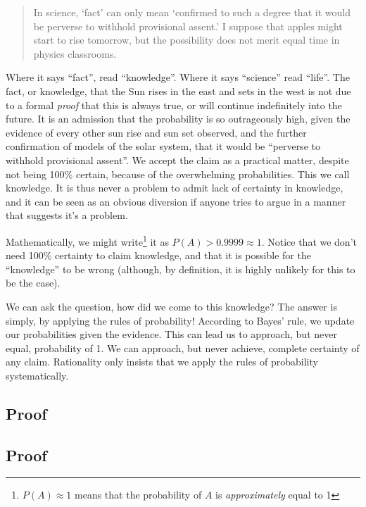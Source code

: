 \documentclass{tufte-book}
\begin{document}
\begin{quote}
In science, `fact' can only mean `confirmed to such a degree that it
would be perverse to withhold provisional assent.' I suppose that apples
might start to rise tomorrow, but the possibility does not merit equal
time in physics classrooms.\citep{gould1981evolution}
\end{quote}

Where it says ``fact'', read ``knowledge''. Where it says ``science''
read ``life''. The fact, or knowledge, that the Sun rises in the east
and sets in the west is not due to a formal \emph{proof} that this is
always true, or will continue indefinitely into the future. It is an
admission that the probability is so outrageously high, given the
evidence of every other sun rise and sun set observed, and the further
confirmation of models of the solar system, that it would be ``perverse
to withhold provisional assent''. We accept the claim as a practical
matter, despite not being 100\% certain, because of the overwhelming
probabilities. This we call knowledge. It is thus never a problem to
admit lack of certainty in knowledge, and it can be seen as an obvious
diversion if anyone tries to argue in a manner that suggests it's a
problem.

Mathematically, we might write\footnote{\(P(A)\approx 1\) means that the
  probability of \(A\) is \emph{approximately} equal to 1} it as
\(P(A)>0.9999 \approx 1\). Notice that we don't need 100\% certainty to
claim knowledge, and that it is possible for the ``knowledge'' to be
wrong (although, by definition, it is highly unlikely for this to be the
case).

We can ask the question, how did we come to this knowledge? The answer
is simply, by applying the rules of probability! According to Bayes'
rule, we update our probabilities given the evidence. This can lead us
to approach, but never equal, probability of 1. We can approach, but
never achieve, complete certainty of any claim. Rationality only insists
that we apply the rules of probability systematically.

\subsection{Proof}\label{proof}

\subsection{Proof}\label{proof-1}
\end{document}

